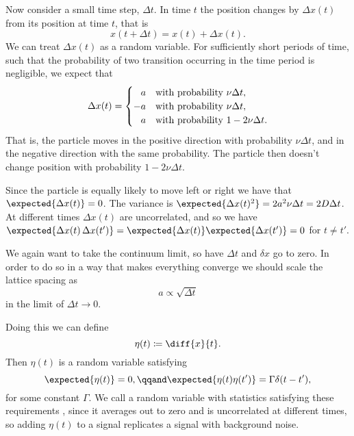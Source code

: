 \documentclass[fleqn]{NotesClass}
\begin{document}
    Now consider a small time step, \(\Delta t\).
    In time \(t\) the position changes by \(\Delta x(t)\) from its position at time \(t\), that is
    \begin{equation}
        x(t + \Delta t) = x(t) + \Delta x(t).
    \end{equation}
    We can treat \(\Delta x(t)\) as a random variable.
    For sufficiently short periods of time, such that the probability of two transition occurring in the time period is negligible, we expect that
    \begin{equation}
        \Delta x(t) = 
        \begin{cases}
            \hphantom{-a}\mathllap{a} & \text{with probability } \nu \Delta t,\\
            -a & \text{with probability } \nu \Delta t,\\
            \hphantom{-a}\mathllap{a} & \text{with probability } 1 - 2\nu \Delta t.
        \end{cases}
    \end{equation}
    That is, the particle moves in the positive direction with probability \(\nu \Delta t\), and in the negative direction with the same probability.
    The particle then doesn't change position with probability \(1 - 2\nu\Delta t\).
    
    Since the particle is equally likely to move left or right we have that \(\expected{\Delta x(t)} = 0\).
    The variance is \(\expected{\Delta x(t)^2} = 2a^2\nu \Delta t = 2D\Delta t\).
    At different times \(\Delta x(t)\) are uncorrelated, and so we have \(\expected{\Delta x(t) \, \Delta x(t')} = \expected{\Delta x(t)}\expected{\Delta x(t')} = 0\) for \(t \ne t'\).
    
    We again want to take the continuum limit, so have \(\Delta t\) and \(\delta x\) go to zero.
    In order to do so in a way that makes everything converge we should scale the lattice spacing as
    \begin{equation}
        a \propto \sqrt{\Delta t}
    \end{equation}
    in the limit of \(\Delta t\to 0\).
    
    Doing this we can define
    \begin{equation}
        \eta(t) \coloneqq \diff{x}{t}.
    \end{equation}
    Then \(\eta(t)\) is a random variable satisfying
    \begin{equation}
        \expected{\eta(t)} = 0, \qqand \expected{\eta(t)\eta(t')} = \Gamma \delta(t - t'),
    \end{equation}
    for some constant \(\Gamma\).
    We call a random variable with statistics satisfying these requirements , since it averages out to zero and is uncorrelated at different times, so adding \(\eta(t)\) to a signal replicates a signal with background noise.
    
\end{document}
